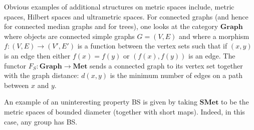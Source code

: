\documentclass[a4paper]{article}
\theoremstyle{definition}
\newtheorem{rem}[lem]{Remark}
\begin{document}
%
%
Obvious examples of additional structures on metric spaces include, metric spaces, Hilbert spaces and ultrametric spaces.
For connected graphs (and hence for connected median graphs and for trees), one looks at the category $\mathbf{Graph}$ where objects are connected simple graphs $G=(V,E)$ and where a morphism $f\colon (V,E)\to(V',E')$ is a function between the vertex sets such that if $(x,y)$ is an edge then either $f(x)=f(y)$ or $(f(x),f(y))$ is an edge.
The functor $F_S\colon\mathbf{Graph}\to\mathbf{Met}$ sends a connected graph to its vertex set together with the graph distance: $d(x,y)$ is the minimum number of edges on a path between $x$ and $y$.


%
%
%
An example of an uninteresting property BS is given by taking $\mathbf{SMet}$ to be the metric spaces of bounded diameter (together with short maps). Indeed, in this case, any group has BS.
\end{document}
